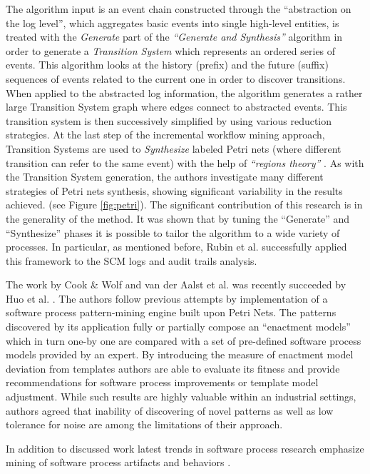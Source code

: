\documentclass{sig-alternate}
\begin{document}
The algorithm input is an event chain constructed through the ``abstraction on the log level'', which aggregates basic events into single high-level entities, is treated with the \textit{Generate} part of the \textit{``Generate and Synthesis''} \cite{citeulike:3718014} algorithm in order to generate a \textit{Transition System} which represents an ordered series of events. This algorithm looks at the history (prefix) and the future (suffix) sequences of events related to the current one in order to discover transitions.  When applied to the abstracted log information, the algorithm generates a rather large Transition System graph where edges connect to abstracted events. This transition system is then successively simplified by using various reduction strategies. At the last step of the incremental workflow mining approach, Transition Systems are used to \textit{Synthesize} labeled Petri nets (where different transition can refer to the same event) with the help of \textit{``regions theory''} \cite{citeulike:5128170}. As with the Transition System generation, the authors investigate many different strategies of Petri nets synthesis, showing significant variability in the results achieved. (see Figure \ref{fig:petri}). The significant contribution of this research is in the generality of the method. It was shown that by tuning the ``Generate'' and ``Synthesize'' phases it is possible to tailor the algorithm to a wide variety of processes. In particular, as mentioned before, Rubin et al. successfully applied this framework to the SCM logs and audit trails analysis.

The work by Cook \& Wolf and van der Aalst et al. was recently succeeded by Huo et al. \cite{citeulike:7690766} \cite{citeulike:7691059}. The authors follow previous attempts by implementation of a software process pattern-mining engine built upon Petri Nets. The patterns discovered by its application fully or partially compose an ``enactment models'' which in turn one-by one are compared with a set of pre-defined software process models provided by an expert. By introducing the measure of enactment model deviation from templates authors are able to evaluate its fitness and provide recommendations for software process improvements or template model adjustment. While such results are highly valuable within an industrial settings, authors agreed that inability of discovering of novel patterns as well as low tolerance for noise are among the limitations of their approach.

In addition to discussed work latest trends in software process research emphasize mining of software process artifacts and behaviors \cite{citeulike:2678511} \cite{citeulike:5043664} \cite{citeulike:5112229}. 
\end{document}
